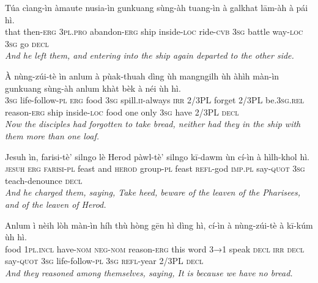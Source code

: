 \documentclass[11pt,a4paper]{article}
\begin{document}
\begin{exe}
\gll Túa cìang-ìn àmaute nusia-ìn gunkuang sùng-àh tuang-ìn à galkhat lām-àh à pái hì. \\
     that then-\textsc{erg} \textsc{3pl}.\textsc{pro} abandon-\textsc{erg} ship inside-\textsc{loc} ride-\textsc{cvb} \textsc{3sg} battle way-\textsc{loc} \textsc{3sg} go \textsc{decl} \\
\glt \textcolor{kjvcolor}{\textit{And he left them, and entering into the ship again departed to the other side.}}

\gll À nùng-zúi-tè ìn anlum à pùak-thuah dìng ùh mangngilh ùh àhìh màn-ìn gunkuang sùng-àh anlum khàt bèk à néi ùh hì. \\
     \textsc{3sg} life-follow-\textsc{pl} \textsc{erg} food \textsc{3sg} spill.\textsc{ii}-always \textsc{irr} 2/3PL forget 2/3PL be.\textsc{3sg}.\textsc{rel} reason-\textsc{erg} ship inside-\textsc{loc} food one only \textsc{3sg} have 2/3PL \textsc{decl} \\
\glt \textcolor{kjvcolor}{\textit{Now the disciples had forgotten to take bread, neither had they in the ship with them more than one loaf.}}

\gll Jesuh ìn, farisi-tè' silngo lè Herod pàwl-tè' silngo kī-dawm ùn cí-ìn à hìlh-khol hì. \\
     \textsc{jesuh} \textsc{erg} \textsc{farisi}-\textsc{pl} feast and \textsc{herod} group-\textsc{pl} feast \textsc{refl}-god \textsc{imp}.\textsc{pl} say-\textsc{quot} \textsc{3sg} teach-denounce \textsc{decl} \\
\glt \textcolor{kjvcolor}{\textit{And he charged them, saying, Take heed, beware of the leaven of the Pharisees, and of the leaven of Herod.}}

\gll Anlum ì nèih lòh màn-ìn híh thù hòng gēn hì dìng hì, cí-ìn à nùng-zúi-tè à kī-kúm ùh hì. \\
     food \textsc{1pl}.\textsc{incl} have-\textsc{nom} \textsc{neg}-\textsc{nom} reason-\textsc{erg} this word \textsc{3→1} speak \textsc{decl} \textsc{irr} \textsc{decl} say-\textsc{quot} \textsc{3sg} life-follow-\textsc{pl} \textsc{3sg} \textsc{refl}-year 2/3PL \textsc{decl} \\
\glt \textcolor{kjvcolor}{\textit{And they reasoned among themselves, saying, It is because we have no bread.}}


\end{exe}
\end{document}
